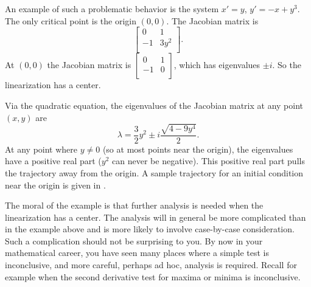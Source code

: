 \begin{example}
An example of such a problematic behavior is the system
$x'=y$, $y' = -x+y^3$.  The only critical point
is the origin $(0,0)$.  The Jacobian matrix is 
\begin{equation*}
\begin{bmatrix}
0 & 1 \\
-1 & 3 y^2 \\
\end{bmatrix} .
\end{equation*}
At 
$(0,0)$ the Jacobian matrix is
$\left[ \begin{smallmatrix}
0 & 1 \\
-1 & 0 \\
\end{smallmatrix} \right]$, which has eigenvalues $\pm i$.  So the
linearization has a center.

Via the quadratic equation, the eigenvalues of the
Jacobian matrix at any point $(x,y)$ are
\begin{equation*}
\lambda = 
\frac{3}{2}y^2 \pm
i
\frac{\sqrt{4-9y^4}}{2} .
\end{equation*}
At any point where $y \neq 0$ (so at most points near the origin), the eigenvalues have a positive real part ($y^2$ can
never be negative).  This positive real part 
pulls the trajectory away from the origin.  A sample trajectory for an
initial condition near the origin is given in
.
\begin{myfig}
\capstart
{}
\caption{An unstable critical point (spiral source) at the origin
for $x'=y$, $y' = -x+y^3$, even if the linearization has a center.  \label{fig:nlin-unstable-center}}
\end{myfig}
\end{example}

The moral of the example is that further analysis is needed when the
linearization has a center.  The analysis will in general be more
complicated than in the example above and is more likely to involve
case-by-case consideration.  Such a complication should not be
surprising to you.  By now in your mathematical career, you have
seen many places where a simple test is inconclusive,
and more careful, perhaps ad hoc, analysis is required.
Recall for example when
the second derivative test for maxima or minima is
inconclusive.

